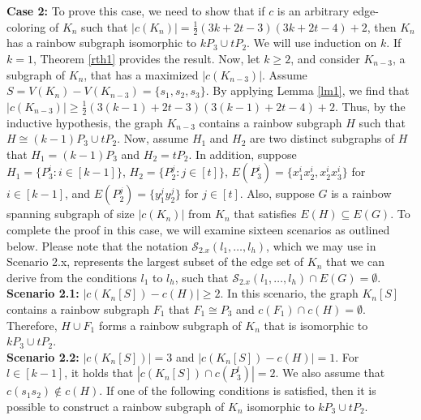 \documentclass[12pt]{article}
\begin{document}
\noindent
{\bf Case 2:} To prove this case, we need to show that if \( c \) is an arbitrary edge-coloring of \( K_n \) such that \( |c(K_n)| = \frac{1}{2}(3k + 2t - 3)(3k + 2t - 4) + 2 \), then \( K_n \) has a rainbow subgraph isomorphic to \( kP_3 \cup tP_2 \). We will use induction on \( k \). If \( k = 1 \), Theorem \ref{rth1} provides the result. Now, let \( k \geq 2 \), and consider \( K_{n-3} \), a subgraph of \( K_n \), that has a maximized \( |c(K_{n-3})| \). Assume \( S = V(K_n) - V(K_{n-3}) = \{s_1, s_2, s_3\} \). By applying Lemma \ref{lm1}, we find that \( |c(K_{n-3})| \geq \frac{1}{2}(3(k-1) + 2t - 3)(3(k-1) + 2t - 4) + 2 \). Thus, by the inductive hypothesis, the graph \( K_{n-3} \) contains a rainbow subgraph \( H \) such that \( H \cong (k-1)P_3 \cup tP_2 \).
 Now, assume $H_1$ and $H_2$ are two distinct subgraphs of $H$ that $H_1=(k-1)P_3$ and $H_2=tP_2$. In addition, suppose $H_1=\{P_3^i:i\in[k-1]\}$, $H_2=\{P_2^j:j\in[t]\}$, $E(P_3^i)=\{x_1^ix_2^i,x_2^ix_3^i\}$ for $i\in[k-1]$, and   $E(P_2^j)=\{y_1^jy_2^j\}$ for $j\in[t]$. Also, suppose \( G \) is a rainbow spanning subgraph of size \( |c(K_n)| \) from \( K_n \) that satisfies \( E(H) \subseteq E(G) \). To complete the proof in this case, we will examine sixteen scenarios as outlined below. Please note that the notation \( \mathcal{S}_{2.x}(l_1, \ldots, l_h) \), which we may use in Scenario 2.x, represents the largest subset of the edge set of \( K_n \) that we can derive from the conditions \( l_1 \) to \( l_h \), such that \( \mathcal{S}_{2.x}(l_1, \ldots, l_h) \cap E(G) = \emptyset \).\\ 
{\bf Scenario 2.1:} \(| c(K_n[S])- c(H)|\geq2  \). In this scenario, the graph \( K_n[S] \) contains a rainbow subgraph \( F_1 \) that \( F_1 \cong P_3 \) and $c(F_1)\cap c(H)=\emptyset$. Therefore, \( H \cup F_1 \) forms a rainbow subgraph of \( K_n \) that is isomorphic to \( kP_3 \cup tP_2 \). \\
{\bf Scenario 2.2:}  \( |c(K_n[S])| = 3 \) and \( |c(K_n[S]) - c(H)| = 1 \). For \( l \in [k-1] \), it holds that \( |c(K_n[S]) \cap c(P_3^l)| = 2 \). We also assume that \( c(s_1s_2) \notin c(H) \). If one of the following conditions is satisfied, then it is possible to construct a rainbow subgraph of \( K_n \) isomorphic to \( kP_3 \cup tP_2 \).
\end{document}

